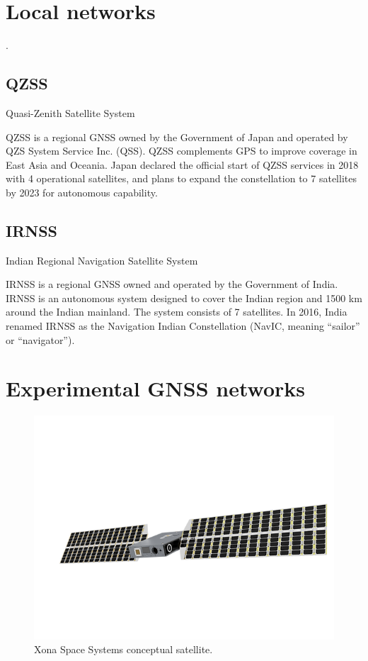 \section{Local networks}

.

\subsection{QZSS}

Quasi-Zenith Satellite System \cite{qzss}

QZSS is a regional GNSS owned by the Government of Japan and operated by QZS System Service Inc. (QSS). QZSS complements GPS to improve coverage in East Asia and Oceania. Japan declared the official start of QZSS services in 2018 with 4 operational satellites, and plans to expand the constellation to 7 satellites by 2023 for autonomous capability.

\subsection{IRNSS}

Indian Regional Navigation Satellite System \cite{irnss}

IRNSS is a regional GNSS owned and operated by the Government of India. IRNSS is an autonomous system designed to cover the Indian region and 1500 km around the Indian mainland. The system consists of 7 satellites. In 2016, India renamed IRNSS as the Navigation Indian Constellation (NavIC, meaning ``sailor'' or ``navigator'').

\section{Experimental GNSS networks}

\cite{aarestad2020}

\begin{figure}[!ht]
    \begin{center}
        \includegraphics[width=\columnwidth]{figures/xona-satellite}
        \caption{Xona Space Systems conceptual satellite.}
        \label{fig:xona-satellite}
    \end{center}
\end{figure}
